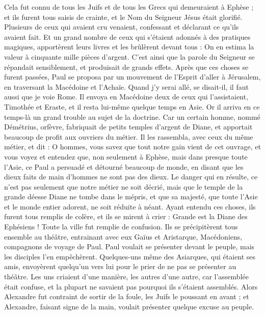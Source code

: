 \begin{multicols}{2}
Cela fut connu de tous les Juifs et de tous les Grecs qui demeuraient à Ephèse ; et ils furent tous saisis de crainte, et le Nom du Seigneur Jésus était glorifié.
Plusieurs de ceux qui avaient cru venaient, confessant et déclarant ce qu'ils avaient fait.
Et un grand nombre de ceux qui s’étaient adonnés à des pratiques magiques, apportèrent leurs livres et les brûlèrent devant tous : On en estima la valeur à cinquante mille pièces d'argent.
C’est ainsi que la parole du Seigneur se répandait sensiblement, et produisait de grands effets.
Après que ces choses se furent passées, Paul se proposa par un mouvement de l'Esprit d'aller à Jérusalem, en traversant la Macédoine et l’Achaïe. Quand j’y serai allé, se disait-il, il faut aussi que je voie Rome.
Il envoya en Macédoine deux de ceux qui l'assistaient, Timothée et Eraste, et il resta lui-même quelque temps en Asie.
Or il arriva en ce temps-là un grand trouble au sujet de la doctrine.
Car un certain homme, nommé Démétrius, orfèvre, fabriquait de petits temples d'argent de Diane, et apportait beaucoup de profit aux ouvriers du métier.
Il les rassembla, avec ceux du même métier, et dit : O hommes, vous savez que tout notre gain vient de cet ouvrage,
et vous voyez et entendez que, non seulement à Ephèse, mais dans presque toute l'Asie, ce Paul a persuadé et détourné beaucoup de monde, en disant que les dieux faits de main d’hommes ne sont pas des dieux.
Le danger qui en résulte, ce n’est pas seulement que notre métier ne soit décrié, mais que le temple de la grande déesse Diane ne tombe dans le mépris, et que sa majesté, que toute l'Asie et le monde entier adorent, ne soit réduite à néant.
Ayant entendu ces choses, ils furent tous remplis de colère, et ils se mirent à crier : Grande est la Diane des Ephésiens !
Toute la ville fut remplie de confusion. Ils se précipitèrent tous ensemble au théâtre, entrainant avec eux Gaïus et Aristarque, Macédoniens, compagnons de voyage de Paul.
Paul voulait se présenter devant le peuple, mais les disciples l’en empêchèrent.
Quelques-uns même des Asiarques, qui étaient ses amis, envoyèrent quelqu’un vers lui pour le prier de ne pas se présenter au théâtre.
Les uns criaient d'une manière, les autres d'une autre, car l'assemblée était confuse, et la plupart ne savaient pas pourquoi ils s’étaient assemblés.
Alors Alexandre fut contraint de sortir de la foule, les Juifs le poussant en avant ; et Alexandre, faisant signe de la main, voulait présenter quelque excuse au peuple.

\end{multicols}
